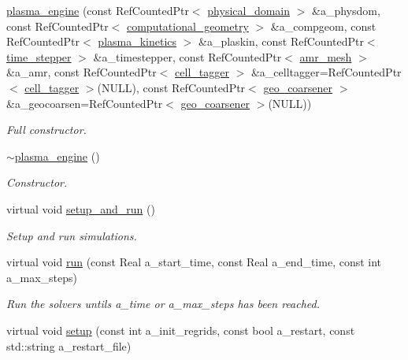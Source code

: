 \begin{DoxyCompactItemize}
\item 
\hyperlink{classplasma__engine_a74b17d921e89f1e0b90af3a46e1445fa}{plasma\+\_\+engine} (const Ref\+Counted\+Ptr$<$ \hyperlink{classphysical__domain}{physical\+\_\+domain} $>$ \&a\+\_\+physdom, const Ref\+Counted\+Ptr$<$ \hyperlink{classcomputational__geometry}{computational\+\_\+geometry} $>$ \&a\+\_\+compgeom, const Ref\+Counted\+Ptr$<$ \hyperlink{classplasma__kinetics}{plasma\+\_\+kinetics} $>$ \&a\+\_\+plaskin, const Ref\+Counted\+Ptr$<$ \hyperlink{classtime__stepper}{time\+\_\+stepper} $>$ \&a\+\_\+timestepper, const Ref\+Counted\+Ptr$<$ \hyperlink{classamr__mesh}{amr\+\_\+mesh} $>$ \&a\+\_\+amr, const Ref\+Counted\+Ptr$<$ \hyperlink{classcell__tagger}{cell\+\_\+tagger} $>$ \&a\+\_\+celltagger=Ref\+Counted\+Ptr$<$ \hyperlink{classcell__tagger}{cell\+\_\+tagger} $>$(N\+U\+LL), const Ref\+Counted\+Ptr$<$ \hyperlink{classgeo__coarsener}{geo\+\_\+coarsener} $>$ \&a\+\_\+geocoarsen=Ref\+Counted\+Ptr$<$ \hyperlink{classgeo__coarsener}{geo\+\_\+coarsener} $>$(N\+U\+LL))
\begin{DoxyCompactList}\small\item\em Full constructor. \end{DoxyCompactList}\item 
\hyperlink{classplasma__engine_a33d729240035443c60db98693c70307b}{$\sim$plasma\+\_\+engine} ()
\begin{DoxyCompactList}\small\item\em Constructor. \end{DoxyCompactList}\item 
virtual void \hyperlink{classplasma__engine_aa534f8694480ce60bbc19ee2fb4d4b33}{setup\+\_\+and\+\_\+run} ()
\begin{DoxyCompactList}\small\item\em Setup and run simulations. \end{DoxyCompactList}\item 
virtual void \hyperlink{classplasma__engine_a2dcfd5e472e7066fd576b16bee63ddbc}{run} (const Real a\+\_\+start\+\_\+time, const Real a\+\_\+end\+\_\+time, const int a\+\_\+max\+\_\+steps)
\begin{DoxyCompactList}\small\item\em Run the solvers untils a\+\_\+time or a\+\_\+max\+\_\+steps has been reached. \end{DoxyCompactList}\item 
virtual void \hyperlink{classplasma__engine_a487f33cc288aac0b5f2fde263ee55f61}{setup} (const int a\+\_\+init\+\_\+regrids, const bool a\+\_\+restart, const std\+::string a\+\_\+restart\+\_\+file)

\end{DoxyCompactItemize}
